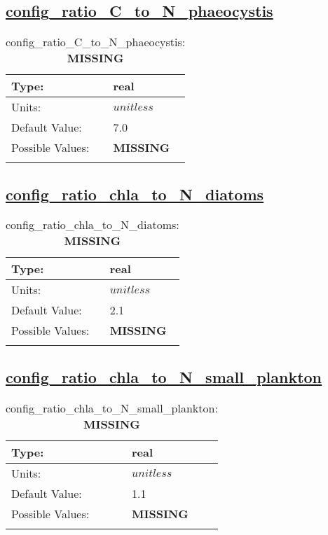 \subsection[config\_ratio\_C\_to\_N\_phaeocystis]{\hyperref[sec:nm_tab_biogeochemistry]{config\_ratio\_C\_to\_N\_phaeocystis}}
\label{subsec:nm_sec_config_ratio_C_to_N_phaeocystis}
\begin{center}
\begin{longtable}{| p{2.0in} || p{4.0in} |}
    \hline
    Type: & real \\
    \hline
    Units: & $unitless$ \\
    \hline
    Default Value: & 7.0 \\
    \hline
    Possible Values: & {\bf \color{red} MISSING} \\
    \hline
    \caption{config\_ratio\_C\_to\_N\_phaeocystis: {\bf \color{red} MISSING}}
\end{longtable}
\end{center}
\subsection[config\_ratio\_chla\_to\_N\_diatoms]{\hyperref[sec:nm_tab_biogeochemistry]{config\_ratio\_chla\_to\_N\_diatoms}}
\label{subsec:nm_sec_config_ratio_chla_to_N_diatoms}
\begin{center}
\begin{longtable}{| p{2.0in} || p{4.0in} |}
    \hline
    Type: & real \\
    \hline
    Units: & $unitless$ \\
    \hline
    Default Value: & 2.1 \\
    \hline
    Possible Values: & {\bf \color{red} MISSING} \\
    \hline
    \caption{config\_ratio\_chla\_to\_N\_diatoms: {\bf \color{red} MISSING}}
\end{longtable}
\end{center}
\subsection[config\_ratio\_chla\_to\_N\_small\_plankton]{\hyperref[sec:nm_tab_biogeochemistry]{config\_ratio\_chla\_to\_N\_small\_plankton}}
\label{subsec:nm_sec_config_ratio_chla_to_N_small_plankton}
\begin{center}
\begin{longtable}{| p{2.0in} || p{4.0in} |}
    \hline
    Type: & real \\
    \hline
    Units: & $unitless$ \\
    \hline
    Default Value: & 1.1 \\
    \hline
    Possible Values: & {\bf \color{red} MISSING} \\
    \hline
    \caption{config\_ratio\_chla\_to\_N\_small\_plankton: {\bf \color{red} MISSING}}
\end{longtable}
\end{center}
